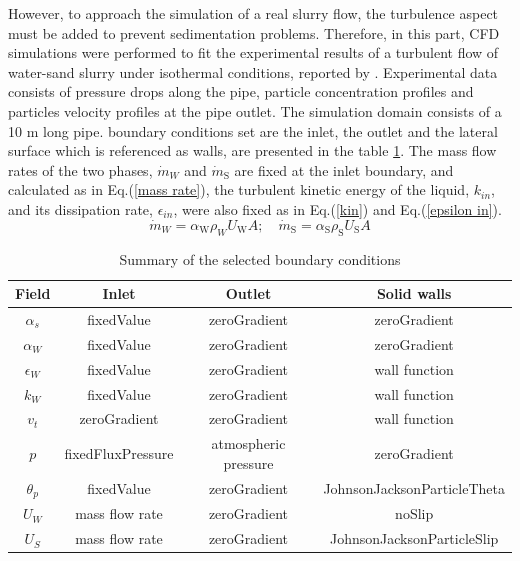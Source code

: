 \documentclass[review,3p,times,12pt]{elsarticle}
\begin{document}
However, to approach the simulation of a real slurry flow, the turbulence aspect must be added to prevent sedimentation problems. Therefore, in this part, CFD simulations were performed to fit the experimental results of a turbulent flow of water-sand slurry under isothermal conditions, reported by \citet{Randal-2004}. Experimental data consists of pressure drops along the pipe, particle concentration profiles and particles velocity profiles at the pipe outlet. The simulation domain consists of a 10 m long pipe. boundary conditions set are the inlet, the outlet and the lateral surface which is referenced as walls, are presented in the table \ref{tab:bc}. The mass flow rates of the two phases, \(\dot{m}_{W}\) and \(\dot{m}_{\mathrm{S}}\) are fixed at the inlet boundary, and calculated as in Eq.(\ref{mass rate}), the turbulent kinetic energy of the liquid, \(k_{in}\), and its dissipation rate, \(\epsilon_{in }\), were also fixed as in Eq.(\ref{kin}) and Eq.(\ref{epsilon in}). 
\begin{equation}
\dot{m}_{W}= \alpha_{\mathrm{W}} \rho_{W} U_{\mathrm{W}} A;\quad \dot{m}_{\mathrm{S}}= \alpha_{\mathrm{S}} \rho_{\mathrm{S}} U_{\mathrm{S}} A
\label{mass rate}
\end{equation}

\begin{table}[H]
\begin{center}
\caption{Summary of the selected boundary conditions}
\label{tab:bc}
\begin{tabular}{cccc}
\hline Field & Inlet & Outlet & Solid walls  \\
\hline\(\alpha_{s}\) & fixedValue & zeroGradient & zeroGradient \\
\(\alpha_{W}\) & fixedValue & zeroGradient & zeroGradient \\
\(\epsilon_{W}\) & fixedValue & zeroGradient & wall function\\
\(k_{W}\) & fixedValue & zeroGradient & wall function \\
\(v_{t}\) & zeroGradient & zeroGradient &  wall function \\
\(p\) & fixedFluxPressure & atmospheric pressure & zeroGradient \\
\(\theta_{p}\) & fixedValue & zeroGradient & JohnsonJacksonParticleTheta\\
\(U_{W}\) & mass flow rate  & zeroGradient & noSlip\\
\(U_{S}\) & mass flow rate  & zeroGradient & JohnsonJacksonParticleSlip  \\
\hline
\end{tabular}
\end{center}
\end{table}
\end{document}
